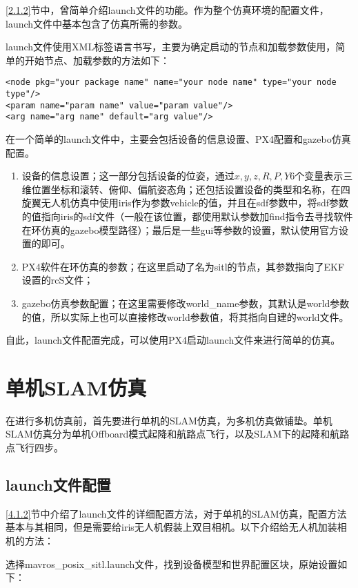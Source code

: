 \ref{2.1.2}节中，曾简单介绍launch文件的功能。作为整个仿真环境的配置文件，launch文件中基本包含了仿真所需的参数。

launch文件使用XML标签语言书写，主要为确定启动的节点和加载参数使用，简单的开始节点、加载参数的方法如下：

\begin{verbatim}
<node pkg="your package name" name="your node name" type="your node type"/>
<param name="param name" value="param value"/>
<arg name="arg name" default="arg value"/>
\end{verbatim}

在一个简单的launch文件中，主要会包括设备的信息设置、PX4配置和gazebo仿真配置。

\begin{enumerate}
	\item 设备的信息设置；这一部分包括设备的位姿，通过$x,y,z,R,P,Y$6个变量表示三维位置坐标和滚转、俯仰、偏航姿态角；还包括设置设备的类型和名称，在四旋翼无人机仿真中使用iris作为参数vehicle的值，并且在sdf参数中，将sdf参数的值指向iris的sdf文件（一般在该位置，都使用默认参数加find指令去寻找软件在环仿真的gazebo模型路径）；最后是一些gui等参数的设置，默认使用官方设置的即可。
	\item PX4软件在环仿真的参数；在这里启动了名为sitl的节点，其参数指向了EKF设置的rcS文件；
	\item gazebo仿真参数配置；在这里需要修改world\_name参数，其默认是world参数的值，所以实际上也可以直接修改world参数值，将其指向自建的world文件。
\end{enumerate}

自此，launch文件配置完成，可以使用PX4启动launch文件来进行简单的仿真。


\section{单机SLAM仿真}

在进行多机仿真前，首先要进行单机的SLAM仿真，为多机仿真做铺垫。单机SLAM仿真分为单机Offboard模式起降和航路点飞行，以及SLAM下的起降和航路点飞行四步。

\subsection{launch文件配置} \label{4.2.1}

\ref{4.1.2}节中介绍了launch文件的详细配置方法，对于单机的SLAM仿真，配置方法基本与其相同，但是需要给iris无人机假装上双目相机。以下介绍给无人机加装相机的方法：

选择mavros\_posix\_sitl.launch文件，找到设备模型和世界配置区块，原始设置如下：

